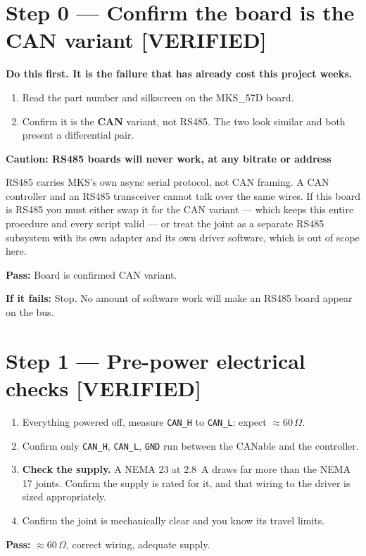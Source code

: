 \documentclass[11pt,letterpaper]{article}
\newenvironment{caution}[1]{%
    \par\addvspace{8pt}%
    \noindent{\color{cautionred}\rule{\linewidth}{0.8pt}}\par\vspace{2pt}
    \noindent\textbf{\color{cautionred}Caution: #1}\par\vspace{2pt}
}{%
    \par\vspace{2pt}\noindent{\color{cautionred}\rule{\linewidth}{0.4pt}}%
    \par\addvspace{8pt}%
}
\newcommand{\verified}{{\color{okgreen}\textbf{[VERIFIED]}}}
\newcommand{\passif}[1]{\par\vspace{2pt}\noindent\textbf{\color{okgreen}Pass:} #1\par\vspace{4pt}}
\newcommand{\failif}[1]{\noindent\textbf{If it fails:} #1\par\vspace{6pt}}
\begin{document}
\section*{Step 0 --- Confirm the board is the CAN variant \verified}
\textbf{Do this first. It is the failure that has already cost this project weeks.}

\begin{enumerate}[leftmargin=*]
    \item Read the part number and silkscreen on the MKS\_57D board.
    \item Confirm it is the \textbf{CAN} variant, not RS485. The two look similar and
          both present a differential pair.
\end{enumerate}

\begin{caution}{RS485 boards will never work, at any bitrate or address}
RS485 carries MKS's own async serial protocol, not CAN framing. A CAN controller and
an RS485 transceiver cannot talk over the same wires. If this board is RS485 you must
either swap it for the CAN variant --- which keeps this entire procedure and every
script valid --- or treat the joint as a separate RS485 subsystem with its own
adapter and its own driver software, which is out of scope here.
\end{caution}
\passif{Board is confirmed CAN variant.}
\failif{Stop. No amount of software work will make an RS485 board appear on the bus.}

\section*{Step 1 --- Pre-power electrical checks \verified}
\begin{enumerate}[leftmargin=*]
    \item Everything powered off, measure \texttt{CAN\_H} to \texttt{CAN\_L}:
          expect $\approx 60\,\Omega$.
    \item Confirm only \texttt{CAN\_H}, \texttt{CAN\_L}, \texttt{GND} run between
          the CANable and the controller.
    \item \textbf{Check the supply.} A NEMA 23 at 2.8~A draws far more than the
          NEMA 17 joints. Confirm the supply is rated for it, and that wiring to the
          driver is sized appropriately.
    \item Confirm the joint is mechanically clear and you know its travel limits.
\end{enumerate}
\passif{$\approx 60\,\Omega$, correct wiring, adequate supply.}
\end{document}
